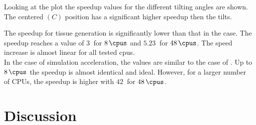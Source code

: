 Looking at the plot the speedup values for the different tilting angles are shown.
The centered $(C)$ position has a significant higher speedup then the tilts.
\par
% 
The \openmp{} speedup for tissue generation is significantly lower than that in the \mpi{} case.
The speedup reaches a value of $\SI{3}{}$ for $\SI{8}{\cpus}$ and $\SI{5.23}{}$ for $\SI{48}{\cpus}$.
The speed increase is almost linear for all tested cpus.
\\
% 
In the case of simulation acceleration, the values are similar to the case of \mpi{}.
Up to $\SI{8}{\cpus}$ the speedup is almost identical and ideal.
However, for a larger number of \acsp{CPU}, the speedup is higher with $\SI{42}{}$ for $\SI{48}{\cpus}$.
% 
% 
\section{Discussion}
% 
